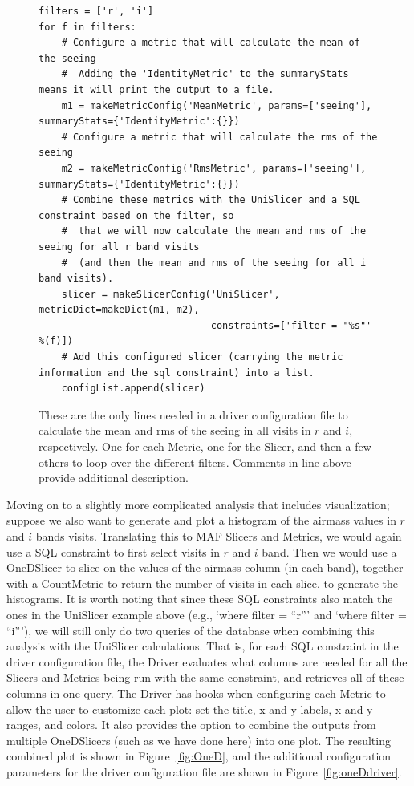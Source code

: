 \documentclass[]{spie}  %
\begin{document}
\begin{figure}
\centering
\begin{lstlisting}[frame=single]
filters = ['r', 'i']
for f in filters:
    # Configure a metric that will calculate the mean of the seeing
    #  Adding the 'IdentityMetric' to the summaryStats means it will print the output to a file.
    m1 = makeMetricConfig('MeanMetric', params=['seeing'], summaryStats={'IdentityMetric':{}})
    # Configure a metric that will calculate the rms of the seeing
    m2 = makeMetricConfig('RmsMetric', params=['seeing'], summaryStats={'IdentityMetric':{}})
    # Combine these metrics with the UniSlicer and a SQL constraint based on the filter, so
    #  that we will now calculate the mean and rms of the seeing for all r band visits
    #  (and then the mean and rms of the seeing for all i band visits).
    slicer = makeSlicerConfig('UniSlicer', metricDict=makeDict(m1, m2),
                              constraints=['filter = "%s"' %(f)])
    # Add this configured slicer (carrying the metric information and the sql constraint) into a list.
    configList.append(slicer)

\end{lstlisting}
\caption[]
{ \label{fig:simpleDriver} These are the only lines needed in a driver
configuration file to calculate the mean and rms of the seeing in all visits in $r$
and $i$, respectively. One for each Metric, one for the Slicer, and
then a few others to loop over the different filters. Comments in-line
above provide additional description.}
\end{figure}

Moving on to a slightly more complicated analysis that includes
visualization; suppose we also want to generate and plot a histogram
of the airmass values in $r$ and $i$ bands visits. Translating this to
MAF Slicers and Metrics, we would again use a SQL constraint to first
select visits in $r$ and $i$ band. Then we would use a OneDSlicer to
slice on the values of the airmass column (in each band), together
with a CountMetric to return the number of visits in each slice, to
generate the histograms. It is worth noting that since these SQL
constraints also match the ones in the UniSlicer example above (e.g.,
`where filter = ``r''' and `where filter = ``i'''), we will still only
do two queries of the database when combining this analysis with the
UniSlicer calculations. That is, for each SQL constraint in the driver
configuration file, the Driver evaluates what columns are needed for
all the Slicers and Metrics being run with the same constraint, and
retrieves all of these columns in one query. The Driver has hooks when
configuring each Metric to allow the user to customize each plot: set
the title, x and y labels, x and y ranges, and colors. It also
provides the option to combine the outputs from multiple OneDSlicers
(such as we have done here) into one plot. The resulting combined plot
is shown in Figure~\ref{fig:OneD}, and the additional configuration
parameters for the driver configuration file are shown in
Figure~\ref{fig:oneDdriver}. 
\end{document}

